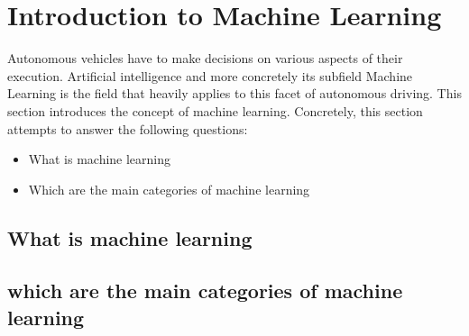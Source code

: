 \section{Introduction to Machine Learning}
\label{intro_ml}

Autonomous vehicles have to make decisions on various aspects of their execution. Artificial intelligence and more concretely its subfield Machine Learning is the field that
heavily applies to this facet of autonomous driving. This section introduces the concept of machine learning. Concretely, this section attempts
to answer the following questions:

\begin{itemize}
\item What is machine learning
\item Which are the main categories of machine learning 
\end{itemize} 



\subsection{What is machine learning}

\subsection{which are the main categories of machine learning}

